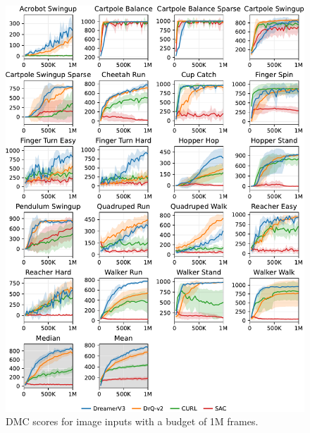 \begin{figure}[h!]
\centering
\includegraphics[width=1\linewidth]{dmc_vision/dmc_vision}
\caption{DMC scores for image inputs with a budget of 1M frames.}
\label{fig:dmc_vision}
\end{figure}

